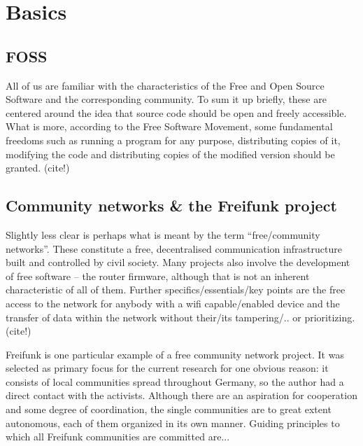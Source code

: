 \section{Basics}
\subsection{FOSS}
All of us are familiar with the characteristics of the Free and Open Source Software and the corresponding community.
To sum it up briefly, these are centered around the idea that source code should be open and freely accessible.
What is more, according to the Free Software Movement,
some fundamental freedoms such as running a program for any purpose, distributing copies of it, modifying the code and distributing copies of the modified version should be granted. (cite!)


\subsection{Community networks \& the Freifunk project}
Slightly less clear is perhaps what is meant by the term ``free/community networks''. %
These constitute a free, decentralised communication infrastructure built and controlled by civil society.
Many projects also involve the development of free software -- the router firmware, although that is not an inherent characteristic of all of them.
Further specifics/essentials/key points are the free access to the network for anybody with a wifi capable/enabled device and the transfer of data within the network without their/its tampering/.. or prioritizing. (cite!)

Freifunk is one particular example of a free community network project.
It was selected as primary focus for the current research for one obvious reason: it consists of local communities spread throughout Germany, so the author had a direct contact with the activists.
Although there are an aspiration for cooperation and some degree of coordination, the single communities are to great extent autonomous, each of them organized in its own manner.
Guiding principles to which all Freifunk communities are committed are...

\begin{comment}
* freie dezentrale Kommunikationsinfrastruktur, in den Händen der Community
* freie Software (die Routerfirmware)
* freier Zugang zum Netzwerk
* Informationen werden durchgereicht ohne diese zu verändern oder priorisieren
\end{comment}

